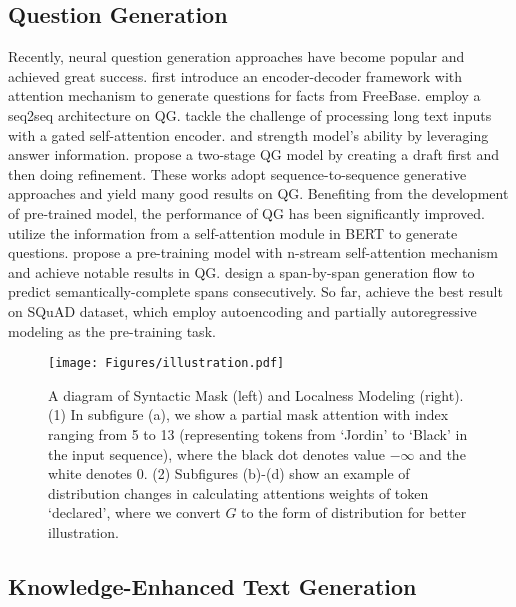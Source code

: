 \documentclass[11pt]{article}
\begin{document}
\subsection{Question Generation}


Recently, neural question generation approaches have become popular and achieved great success.  \citet{serban-etal-2016-generating} first introduce an encoder-decoder framework with attention mechanism to generate questions for facts from FreeBase.  \citet{du-etal-2017-learning} employ a seq2seq architecture on QG. \citet{zhao-etal-2018-paragraph} tackle the challenge of processing long text inputs with a gated self-attention encoder. \citet{song-etal-2018-leveraging} and \citet{Kim_Lee_Shin_Jung_2019} strength model's ability by leveraging answer information. \citet{Meng_Ren_Chen_Monz_Ma_de_Rijke_2020} propose a two-stage QG model by creating a draft first and then doing refinement. These works adopt sequence-to-sequence generative approaches and yield many good results on QG. Benefiting from the development of pre-trained model, the performance of QG has been significantly improved. \citet{varanasi-etal-2020-copybert} utilize the information from a self-attention module in BERT \citep{devlin-etal-2019-bert} to generate questions. \citet{qi-etal-2020-prophetnet} propose a pre-training model with n-stream self-attention mechanism and achieve notable results in QG. \citet{ijcai2020-553} design a span-by-span generation flow to predict semantically-complete spans consecutively. So far, \citet{bao2020unilmv2} achieve the best result on SQuAD dataset, which employ autoencoding and partially autoregressive modeling as the pre-training task. 

\begin{figure*}[!ht]
    \centering
    \texttt{[image: Figures/illustration.pdf]}
    \caption{A diagram of Syntactic Mask (left) and Localness Modeling (right). (1) In subfigure (a), we show a partial mask attention with index ranging from 5 to 13 (representing tokens from `Jordin' to `Black' in the input sequence), where the black dot denotes value $-\infty$ and the white denotes 0. (2) Subfigures (b)-(d) show an example of distribution changes in calculating attentions weights of token `declared', where we convert $G$ to the form of distribution for better illustration.}
    \label{localness-fig}
\end{figure*}


\subsection{Knowledge-Enhanced Text Generation}
\end{document}
